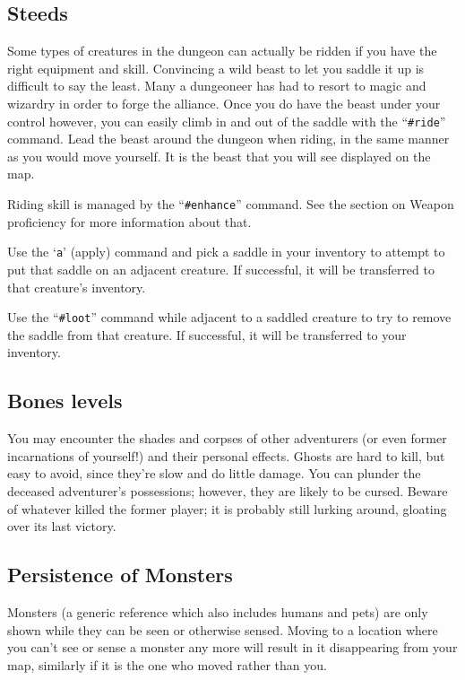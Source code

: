 \subsection*{Steeds}

Some types of creatures in the dungeon can actually be ridden if you
have the right equipment and skill.  Convincing a wild beast to let
you saddle it up is difficult to say the least.  Many a dungeoneer
has had to resort to magic and wizardry in order to forge the alliance.
Once you do have the beast under your control however, you can
easily climb in and out of the saddle with the ``{\tt \#ride}'' command.  Lead
the beast around the dungeon when riding, in the same manner as
you would move yourself.  It is the beast that you will see displayed
on the map.

Riding skill is managed by the ``{\tt \#enhance}'' command.  See the section
on Weapon proficiency for more information about that.

Use the `{\tt a}' (apply) command and pick a saddle in your inventory to
attempt to put that saddle on an adjacent creature.  If successful,
it will be transferred to that creature's inventory.

Use the ``{\tt \#loot}'' command while adjacent to a saddled creature to
try to remove the saddle from that creature.  If successful, it will
be transferred to your inventory.

\subsection*{Bones levels}

You may encounter the shades and corpses of other adventurers (or even
former incarnations of yourself!) and their personal effects.  Ghosts
are hard to kill, but easy to avoid, since they're slow and do little
damage.  You can plunder the deceased adventurer's possessions;
however, they are likely to be cursed.  Beware of whatever killed the
former player; it is probably still lurking around, gloating over its
last victory.

\subsection*{Persistence of Monsters}

Monsters (a generic reference which also includes humans and pets) are only
shown while they can be seen or otherwise sensed.
Moving to a location where you can't see or sense a monster any more
will result in it disappearing from your map, similarly if it is the
one who moved rather than you.

